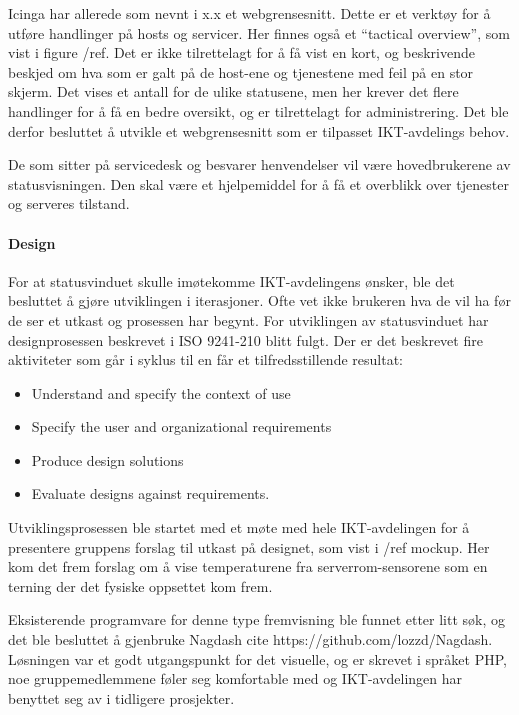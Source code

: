 Icinga har allerede som nevnt i x.x et webgrensesnitt. Dette er et verktøy for å utføre handlinger på hosts og servicer. Her finnes også et “tactical overview”, som vist i figure /ref. Det er ikke tilrettelagt for å få vist en kort, og beskrivende beskjed om hva som er galt på de host-ene og tjenestene med feil på en stor skjerm. Det vises et antall for de ulike statusene, men her krever det flere handlinger for å få en bedre oversikt, og er tilrettelagt for administrering. Det ble derfor besluttet å utvikle et webgrensesnitt som er tilpasset IKT-avdelings behov.


De som sitter på servicedesk og besvarer henvendelser vil være hovedbrukerene av statusvisningen. Den skal være et hjelpemiddel for å få et overblikk over tjenester og serveres tilstand.

\paragraph{Design}

For at statusvinduet skulle imøtekomme IKT-avdelingens ønsker, ble det besluttet å gjøre utviklingen i iterasjoner. Ofte vet ikke brukeren hva de vil ha før de ser et utkast og prosessen har begynt. For utviklingen av statusvinduet har designprosessen beskrevet i ISO 9241-210 blitt fulgt. Der er det beskrevet fire aktiviteter som går i syklus til en får et tilfredsstillende resultat:

\begin{itemize}
	\item Understand and specify the context of use
	\item Specify the user and organizational requirements
	\item Produce design solutions
	\item Evaluate designs against requirements.
\end{itemize}

Utviklingsprosessen ble startet med et møte med hele IKT-avdelingen for å presentere gruppens forslag til utkast på designet, som vist i  /ref mockup. Her kom det frem forslag om å vise temperaturene fra serverrom-sensorene som en terning der det fysiske oppsettet kom frem.

Eksisterende programvare for denne type fremvisning ble funnet etter litt søk, og det ble besluttet å gjenbruke Nagdash cite https://github.com/lozzd/Nagdash. Løsningen var et godt utgangspunkt for det visuelle, og er skrevet i språket PHP, noe gruppemedlemmene føler seg komfortable med og IKT-avdelingen har benyttet seg av i tidligere prosjekter. 

